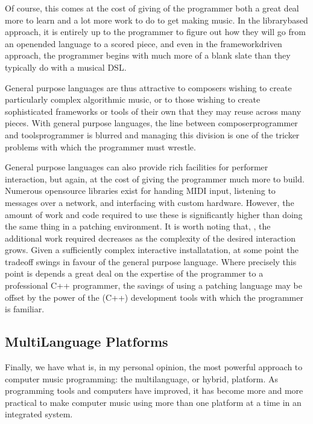 \documentclass[letterpaper,10pt,english]{sphinxmanual}
\begin{document}
\sphinxAtStartPar
Of course, this comes at the cost of giving of the programmer both a great deal more
to learn and a lot more work to do to get making music.
In the library\sphinxhyphen{}based approach, it is entirely up to the programmer to figure out
how they will go from an open\sphinxhyphen{}ended language to a scored piece,
and even in the framework\sphinxhyphen{}driven approach, the programmer begins with
much more of a blank slate than they typically do with a musical DSL.

\sphinxAtStartPar
General purpose languages are thus attractive to composers wishing
to create particularly complex algorithmic music, or to those wishing to create sophisticated
frameworks or tools of their own that they may reuse across many pieces.
With general purpose languages, the line between composer\sphinxhyphen{}programmer and tools\sphinxhyphen{}programmer
is blurred and managing this division is one of the tricker problems
with which the programmer must wrestle.

\sphinxAtStartPar
General purpose languages can also provide rich facilities for
performer interaction, but again, at the cost of giving the programmer much more
to build. Numerous open\sphinxhyphen{}source libraries exist for handing MIDI input, listening to
messages over a network, and interfacing with custom hardware.
However, the amount of work and code required to use these is significantly
higher than doing the same thing in a patching environment.
It is worth noting that, , the additional work required decreases as the complexity
of the desired interaction grows. Given a sufficiently complex interactive
installatation, at some point the tradeoff swings in favour of the general
purpose language. Where precisely this point is depends a great deal
on the expertise of the programmer \sphinxhyphen{} to a professional C++ programmer, the
savings of using a patching language may be offset by the power of the
(C++) development tools with which the programmer is familiar.


\subsection{Multi\sphinxhyphen{}Language Platforms}
\label{\detokenize{background:multi-language-platforms}}
\sphinxAtStartPar
Finally, we have what is, in my personal opinion, the most powerful approach to computer music programming:
the multi\sphinxhyphen{}language, or hybrid, platform.
As programming tools and computers have improved,
it has become more and more practical to make computer music using more than one platform at a time
in an integrated system.
\end{document}
